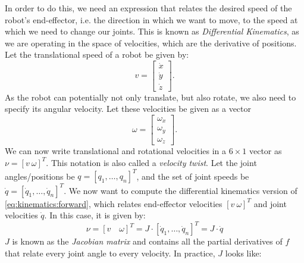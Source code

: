 In order to do this, we need an expression that relates the desired speed of the robot's end-effector, i.e. the direction in which we want to move, to the speed at which we need to change our joints.
This is known as \emph{Differential Kinematics}, as we are operating in the space of velocities, which are the derivative of positions.
Let the translational speed of a robot be given by:
\begin{equation}
v=\left[\begin{array}{c}
\dot{x}\\
\dot{y}\\
\dot{z}
\end{array}
\right].
\end{equation}
As the robot can potentially not only translate, but also rotate, we also need to specify its angular velocity. Let these velocities be given as a vector
\begin{equation}
\omega=\left[\begin{array}{c}
\omega_x\\
\omega_y\\
\omega_z
\end{array}
\right].
\end{equation}
We can now write translational and rotational velocities in a $6\times1$ vector as $\nu = [v \ \omega]^T$.
This notation is also called a \emph{velocity twist}. %
Let the joint angles/positions be $q=[q_1, \ldots, q_n]^T$, and the set of joint speeds be $\dot{q}=[\dot{q}_1, \ldots, \dot{q}_n]^T$.
%
We now want to compute the differential kinematics version of \cref{eq:kinematics:forward}, which relates end-effector velocities $[v \ \omega]^T$ and joint velocities $\dot{q}$. In this case, it is given by:
\begin{equation}\label{eq:kinematics:diff:short}
\nu = [v \quad \omega]^T=J\cdot [\dot{q}_1,\ldots,\dot{q}_n]^T = J \cdot \dot{q}
\end{equation}
$J$ is known as the \emph{Jacobian matrix}  and contains all the partial derivatives of $f$ that relate every joint angle to every velocity. In practice, $J$ looks like:


